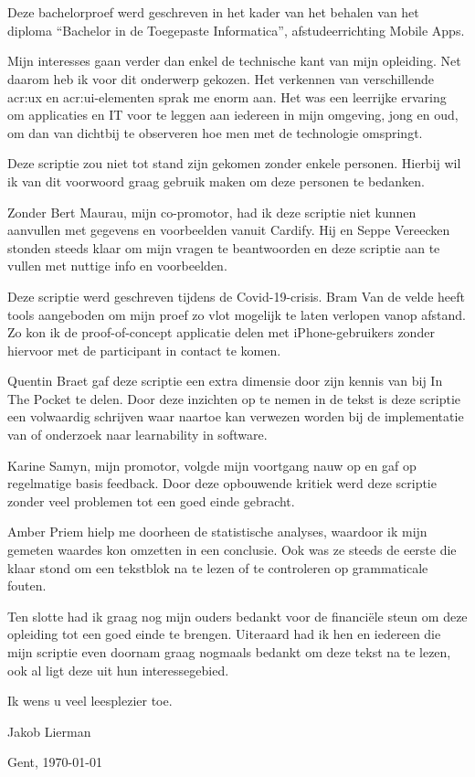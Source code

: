 
\chapter*{}
\label{ch:voorwoord}

Deze bachelorproef werd geschreven in het kader van het behalen van het diploma ``Bachelor in de Toegepaste Informatica'', afstudeerrichting Mobile Apps.

Mijn interesses gaan verder dan enkel de technische kant van mijn opleiding. Net daarom heb ik voor dit onderwerp gekozen. Het verkennen van verschillende \acrshort{acr:ux} en \acrshort{acr:ui}-elementen sprak me enorm aan. Het was een leerrijke ervaring om applicaties en IT voor te leggen aan iedereen in mijn omgeving, jong en oud, om dan van dichtbij te observeren hoe men met de technologie omspringt.

Deze scriptie zou niet tot stand zijn gekomen zonder enkele personen. Hierbij wil ik van dit voorwoord graag gebruik maken om deze personen te bedanken. 

Zonder Bert Maurau, mijn co-promotor, had ik deze scriptie niet kunnen aanvullen met gegevens en voorbeelden vanuit Cardify. Hij en Seppe Vereecken stonden steeds klaar om mijn vragen te beantwoorden en deze scriptie aan te vullen met nuttige info en voorbeelden.

Deze scriptie werd geschreven tijdens de Covid-19-crisis. Bram Van de velde heeft tools aangeboden om mijn proef zo vlot mogelijk te laten verlopen vanop afstand. Zo kon ik de proof-of-concept applicatie delen met iPhone-gebruikers zonder hiervoor met de participant in contact te komen.

Quentin Braet gaf deze scriptie een extra dimensie door zijn kennis van bij In The Pocket te delen. Door deze inzichten op te nemen in de tekst is deze scriptie een volwaardig schrijven waar naartoe kan verwezen worden bij de implementatie van of onderzoek naar learnability in software.

Karine Samyn, mijn promotor, volgde mijn voortgang nauw op en gaf op regelmatige basis feedback. Door deze opbouwende kritiek werd deze scriptie zonder veel problemen tot een goed einde gebracht.

Amber Priem hielp me doorheen de statistische analyses, waardoor ik mijn gemeten waardes kon omzetten in een conclusie. Ook was ze steeds de eerste die klaar stond om een tekstblok na te lezen of te controleren op grammaticale fouten.

Ten slotte had ik graag nog mijn ouders bedankt voor de financiële steun om deze opleiding tot een goed einde te brengen. Uiteraard had ik hen en iedereen die mijn scriptie even doornam graag nogmaals bedankt om deze tekst na te lezen, ook al ligt deze uit hun interessegebied.

Ik wens u veel leesplezier toe.

Jakob Lierman

Gent, \shortdate\today


